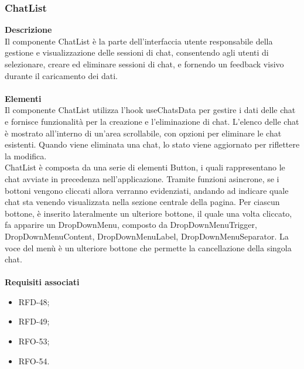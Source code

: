 \subsubsection{ChatList}
\textbf{Descrizione}\\
Il componente ChatList è la parte dell'interfaccia utente responsabile della gestione e visualizzazione delle sessioni di chat, consentendo agli utenti di selezionare, creare ed eliminare sessioni di chat, e fornendo un feedback visivo durante il caricamento dei dati.\\ \\
\textbf{Elementi}\\
Il componente ChatList utilizza l'hook useChatsData per gestire i dati delle chat e fornisce funzionalità per la creazione e l'eliminazione di chat. L'elenco delle chat è mostrato all'interno di un'area scrollabile, con opzioni per eliminare le chat esistenti. Quando viene eliminata una chat, lo stato viene aggiornato per riflettere la modifica.\\
ChatList è composta da una serie di elementi Button, i quali rappresentano  le chat avviate in precedenza nell'applicazione. Tramite funzioni asincrone, se i bottoni vengono cliccati allora verranno evidenziati, andando ad indicare quale chat sta venendo visualizzata nella sezione centrale della pagina. Per ciascun bottone, è inserito lateralmente un ulteriore bottone, il quale una volta cliccato, fa apparire un DropDownMenu, composto da DropDownMenuTrigger, DropDownMenuContent, DropDownMenuLabel, DropDownMenuSeparator. La voce del menù è un ulteriore bottone che permette la cancellazione della singola chat.  \\ \\
\textbf{Requisiti associati}
\begin{itemize}[itemsep=-4pt]
    \item RFD-48;
    \item RFD-49;
    \item RFO-53;
    \item RFO-54.
\end{itemize}

